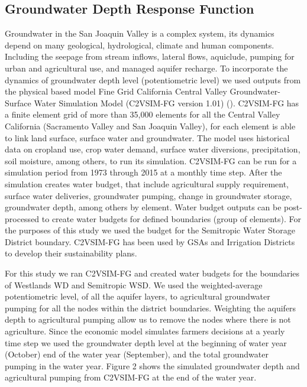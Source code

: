 \documentclass[11pt,a4paper]{article}
\begin{document}
\subsection{Groundwater Depth Response Function}

Groundwater in the San Joaquin Valley is a complex system, its dynamics depend on many geological, hydrological, climate and human components. Including the seepage from stream inflows, lateral flows, aquiclude, pumping for urban and agricultural use, and managed aquifer recharge. To incorporate the dynamics of groundwater depth level (potentiometric level) we used outputs from the physical based model Fine Grid California Central Valley Groundwater-Surface Water Simulation Model (C2VSIM-FG version 1.01) (). C2VSIM-FG has a finite element grid of more than 35,000 elements for all the Central Valley California (Sacramento Valley and San Joaquin Valley), for each element is able to link land surface, surface water and groundwater. The model uses historical data on cropland use, crop water demand, surface water diversions, precipitation, soil moisture, among others, to run its simulation. C2VSIM-FG can be run for a simulation period from 1973 through 2015 at a monthly time step. After the simulation creates water budget, that include agricultural supply requirement, surface water deliveries, groundwater pumping, change in groundwater storage, groundwater depth, among others by element. Water budget outputs can be post-processed to create water budgets for defined boundaries (group of elements). For the purposes of this study we used the budget for the Semitropic Water Storage District boundary. C2VSIM-FG has been used by GSAs and Irrigation Districts to develop their sustainability plans.

For this study we ran C2VSIM-FG and created water budgets for the boundaries of Westlands WD and Semitropic WSD. We used the weighted-average potentiometric level, of all the aquifer layers, to agricultural groundwater pumping for all the nodes within the district boundaries. Weighting the aquifers depth to agricultural pumping allow us to remove the nodes where there is not agriculture. Since the economic model simulates farmers decisions at a yearly time step we used the groundwater depth level at the beginning of water year (October) end of the water year (September), and the total groundwater pumping in the water year. Figure 2 shows the simulated groundwater depth and agricultural pumping from C2VSIM-FG at the end of the water year. 
\end{document}
